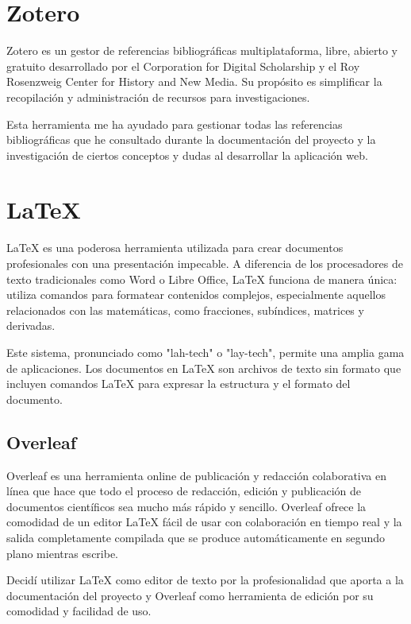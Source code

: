 \clearpage

\section{Zotero}
Zotero \cite{zotero} es un gestor de referencias bibliográficas multiplataforma, libre, abierto y gratuito desarrollado por el Corporation for Digital Scholarship y el Roy Rosenzweig Center for History and New Media. Su propósito es simplificar la recopilación y administración de recursos para investigaciones.

Esta herramienta me ha ayudado para gestionar todas las referencias bibliográficas que he consultado durante la documentación del proyecto y la investigación de ciertos conceptos y dudas al desarrollar la aplicación web.

\hfill

\section{LaTeX}
LaTeX \cite{latex} es una poderosa herramienta utilizada para crear documentos profesionales con una presentación impecable. A diferencia de los procesadores de texto tradicionales como Word o Libre Office, LaTeX funciona de manera única: utiliza comandos para formatear contenidos complejos, especialmente aquellos relacionados con las matemáticas, como fracciones, subíndices, matrices y derivadas.

Este sistema, pronunciado como "lah-tech" o "lay-tech", permite una amplia gama de aplicaciones. Los documentos en LaTeX son archivos de texto sin formato que incluyen comandos LaTeX para expresar la estructura y el formato del documento.

\subsection{Overleaf}
Overleaf \cite{overleaf} es una herramienta online de publicación y redacción colaborativa en línea que hace que todo el proceso de redacción, edición y publicación de documentos científicos sea mucho más rápido y sencillo. Overleaf ofrece la comodidad de un editor LaTeX fácil de usar con colaboración en tiempo real y la salida completamente compilada que se produce automáticamente en segundo plano mientras escribe.

Decidí utilizar LaTeX como editor de texto por la profesionalidad que aporta a la documentación del proyecto y Overleaf como herramienta de edición por su comodidad y facilidad de uso.


